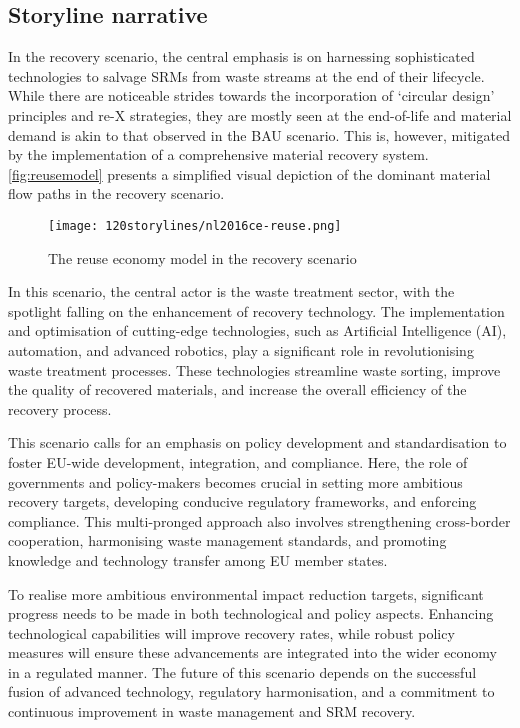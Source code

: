 \subsection{Storyline narrative}

In the recovery scenario, the central emphasis is on harnessing sophisticated technologies to salvage SRMs from waste streams at the end of their lifecycle. While there are noticeable strides towards the incorporation of `circular design' principles and re-X strategies, they are mostly seen at the end-of-life and material demand is akin to that observed in the BAU scenario. This is, however, mitigated by the implementation of a comprehensive material recovery system. \autoref{fig:reusemodel} presents a simplified visual depiction of the dominant material flow paths in the recovery scenario.


\begin{figure}[h!]
  \centering
  \texttt{[image: 120storylines/nl2016ce-reuse.png]}
  \caption[The reuse economy model in the recovery scenario]{The reuse economy model in the recovery scenario~\cite{nl2016ceplan}}
  \label{fig:reusemodel}
\end{figure}

In this scenario, the central actor is the waste treatment sector, with the spotlight falling on the enhancement of recovery technology. The implementation and optimisation of cutting-edge technologies, such as Artificial Intelligence (AI), automation, and advanced robotics, play a significant role in revolutionising waste treatment processes. These technologies streamline waste sorting, improve the quality of recovered materials, and increase the overall efficiency of the recovery process.

This scenario calls for an emphasis on policy development and standardisation to foster EU-wide development, integration, and compliance. Here, the role of governments and policy-makers becomes crucial in setting more ambitious recovery targets, developing conducive regulatory frameworks, and enforcing compliance. This multi-pronged approach also involves strengthening cross-border cooperation, harmonising waste management standards, and promoting knowledge and technology transfer among EU member states.

To realise more ambitious environmental impact reduction targets, significant progress needs to be made in both technological and policy aspects. Enhancing technological capabilities will improve recovery rates, while robust policy measures will ensure these advancements are integrated into the wider economy in a regulated manner. The future of this scenario depends on the successful fusion of advanced technology, regulatory harmonisation, and a commitment to continuous improvement in waste management and SRM recovery.

